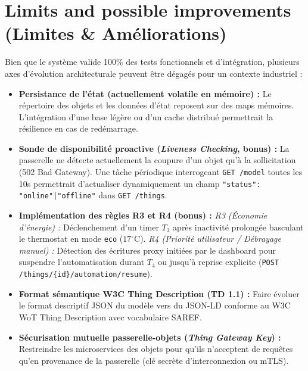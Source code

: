 \documentclass[10pt,a4paper]{article}
\begin{document}
\section{Limits and possible improvements (Limites \& Améliorations)}
Bien que le système valide 100\% des tests fonctionnels et d'intégration, plusieurs axes d'évolution architecturale peuvent être dégagés pour un contexte industriel :
\begin{itemize}
  \item \textbf{Persistance de l'état (actuellement volatile en mémoire) :} Le répertoire des objets et les données d'état reposent sur des maps mémoires. L'intégration d'une base légère ou d'un cache distribué permettrait la résilience en cas de redémarrage.
  \item \textbf{Sonde de disponibilité proactive (\emph{Liveness Checking}, bonus) :} La passerelle ne détecte actuellement la coupure d'un objet qu'à la sollicitation (502 Bad Gateway). Une tâche périodique interrogeant \texttt{GET /model} toutes les 10s permettrait d'actualiser dynamiquement un champ \texttt{"status": "online"|"offline"} dans \texttt{GET /things}.
  \item \textbf{Implémentation des règles R3 et R4 (bonus) :}
  \emph{R3 (Économie d'énergie) :} Déclenchement d'un timer $T_3$ après inactivité prolongée basculant le thermostat en mode \texttt{eco} ($17^\circ\text{C}$).
  \emph{R4 (Priorité utilisateur / Débrayage manuel) :} Détection des écritures proxy initiées par le dashboard pour suspendre l'automatisation durant $T_4$ ou jusqu'à reprise explicite (\texttt{POST /things/\{id\}/automation/resume}).
  \item \textbf{Format sémantique W3C Thing Description (TD 1.1) :} Faire évoluer le format descriptif JSON du modèle vers du JSON-LD conforme au W3C WoT Thing Description avec vocabulaire SAREF.
  \item \textbf{Sécurisation mutuelle passerelle-objets (\emph{Thing Gateway Key}) :} Restreindre les microservices des objets pour qu'ils n'acceptent de requêtes qu'en provenance de la passerelle (clé secrète d'interconnexion ou mTLS).
\end{itemize}
\end{document}

